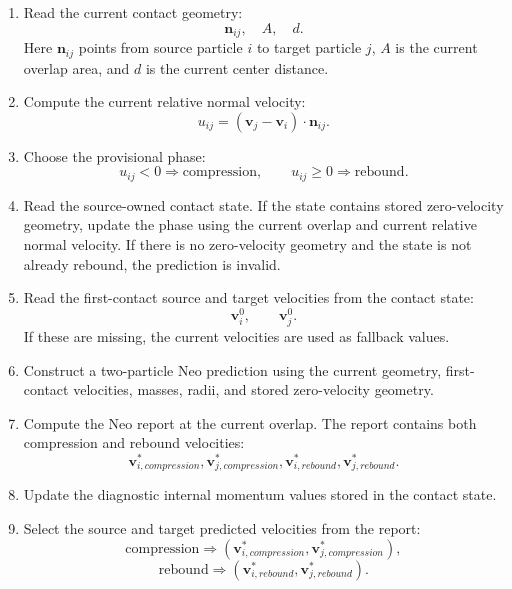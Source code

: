 \begin{enumerate}
    \item Read the current contact geometry:
    \[
        \mathbf{n}_{ij},\quad A,\quad d .
    \]
    Here \(\mathbf{n}_{ij}\) points from source particle \(i\) to target
    particle \(j\), \(A\) is the current overlap area, and \(d\) is the current
    center distance.

    \item Compute the current relative normal velocity:
    \[
        u_{ij}
        =
        \left(
            \mathbf{v}_j
            -
            \mathbf{v}_i
        \right)
        \cdot
        \mathbf{n}_{ij}.
    \]

    \item Choose the provisional phase:
    \[
        u_{ij} < 0 \Rightarrow \text{compression},
        \qquad
        u_{ij} \ge 0 \Rightarrow \text{rebound}.
    \]

    \item Read the source-owned contact state. If the state contains stored
    zero-velocity geometry, update the phase using the current overlap and
    current relative normal velocity. If there is no zero-velocity geometry and
    the state is not already rebound, the prediction is invalid.

    \item Read the first-contact source and target velocities from the contact
    state:
    \[
        \mathbf{v}_{i}^{0},
        \qquad
        \mathbf{v}_{j}^{0}.
    \]
    If these are missing, the current velocities are used as fallback values.

    \item Construct a two-particle Neo prediction using the current geometry,
    first-contact velocities, masses, radii, and stored zero-velocity geometry.

    \item Compute the Neo report at the current overlap. The report contains
    both compression and rebound velocities:
    \[
        \mathbf{v}_{i,compression}^{\ast},
        \mathbf{v}_{j,compression}^{\ast},
        \mathbf{v}_{i,rebound}^{\ast},
        \mathbf{v}_{j,rebound}^{\ast}.
    \]

    \item Update the diagnostic internal momentum values stored in the contact
    state.

    \item Select the source and target predicted velocities from the report:
    \[
        \text{compression}
        \Rightarrow
        \left(
            \mathbf{v}_{i,compression}^{\ast},
            \mathbf{v}_{j,compression}^{\ast}
        \right),
    \]
    \[
        \text{rebound}
        \Rightarrow
        \left(
            \mathbf{v}_{i,rebound}^{\ast},
            \mathbf{v}_{j,rebound}^{\ast}
        \right).
    \]


\end{enumerate}
